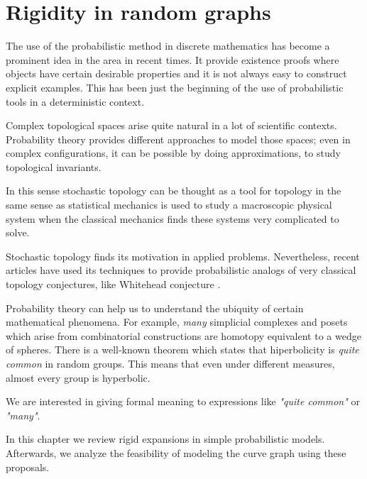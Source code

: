 
\chapter{Rigidity in random graphs} %

\label{Chapter2} %



The use of the probabilistic method in discrete mathematics has become a prominent idea in the area in recent times. It provide existence proofs where objects have certain desirable properties and it is not always easy to construct explicit examples. This has been just the beginning of the use of probabilistic tools in a deterministic context.

Complex topological spaces arise quite natural in a lot of scientific contexts. Probability theory provides different approaches to model those spaces; even in complex configurations, it can be possible by doing approximations, to study topological invariants. 

In this sense stochastic topology can be thought as a tool for topology in the same sense as statistical mechanics is used to study a macroscopic physical system when the classical mechanics finds these systems very complicated to solve.

Stochastic topology finds its motivation in applied problems. Nevertheless, recent articles have used its techniques to provide probabilistic analogs of very classical topology conjectures, like Whitehead conjecture \cite{Costa15}.

Probability theory can help us to understand the ubiquity of certain mathematical phenomena. For example, \textit{many} simplicial complexes and posets which arise from combinatorial constructions are homotopy equivalent to a wedge of spheres. There is a well-known theorem which states that hiperbolicity is \textit{quite common} in random groups. This means that even under different measures, almost every group is hyperbolic.

We are interested in giving formal meaning to expressions like \textit{"quite common"} or \textit{"many"}.

In this chapter we review rigid expansions in simple probabilistic models. Afterwards, we analyze the feasibility of modeling the curve graph using these proposals.

